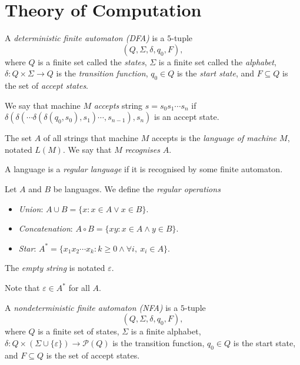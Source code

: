 \chapter{Theory of Computation}
\begin{defn}
  A \emph{deterministic finite automaton (DFA)} is a $5$-tuple 
  \[(Q,\Sigma,\delta,q_0,F),\] where $Q$
  is a finite set called the \emph{states}, $\Sigma$ is a finite set called the
  \emph{alphabet}, $\delta:Q\times\Sigma\to Q$ is the \emph{transition
  function}, $q_0\in Q$ is the \emph{start state}, and $F\subseteq Q$ is the
  set of \emph{accept states}.
\end{defn}
\begin{defn}
  We say that machine $M$ \emph{accepts} string $s=s_0s_1\cdots s_n$ if
  $\delta(\delta(\cdots\delta(\delta(q_0,s_0),s_1)\cdots,s_{n-1}),s_n)$ is an
  accept state.
\end{defn}
\begin{defn}
  The set $A$ of all strings that machine $M$ accepts is the \emph{language of
  machine $M$}, notated $L(M)$. We say that $M$ \emph{recognises} $A$.
\end{defn}
\begin{defn}
  A language is a \emph{regular language} if it is recognised by some finite
  automaton.
\end{defn}
\begin{defn}
  Let $A$ and $B$ be languages. We define the \emph{regular operations}
  \begin{itemize}
    \item \emph{Union}: $A\cup B=\{x:x\in A\vee x\in B\}$.
    \item \emph{Concatenation}: $A\circ B=\{xy:x\in A\wedge y\in B\}$.
    \item \emph{Star}: $A^*=\{x_1x_2\cdots x_k: k\ge 0\wedge \forall i,\ x_i\in
      A\}$.
  \end{itemize}
\end{defn}
\begin{defn}
  The \emph{empty string} is notated $\varepsilon$.
\end{defn}
\begin{rem}
  Note that $\varepsilon\in A^*$ for all $A$.
\end{rem}
\begin{defn}
  A \emph{nondeterministic finite automaton (NFA)} is a $5$-tuple
  \[(Q,\Sigma,\delta,q_0,F),\] where $Q$ is a finite set of states, $\Sigma$ is a
  finite alphabet, $\delta:Q\times(\Sigma\cup\{\varepsilon\})\to\mathcal P(Q)$
  is the transition function, $q_0\in Q$ is the start state, and $F\subseteq Q$
  is the set of accept states.
\end{defn}
